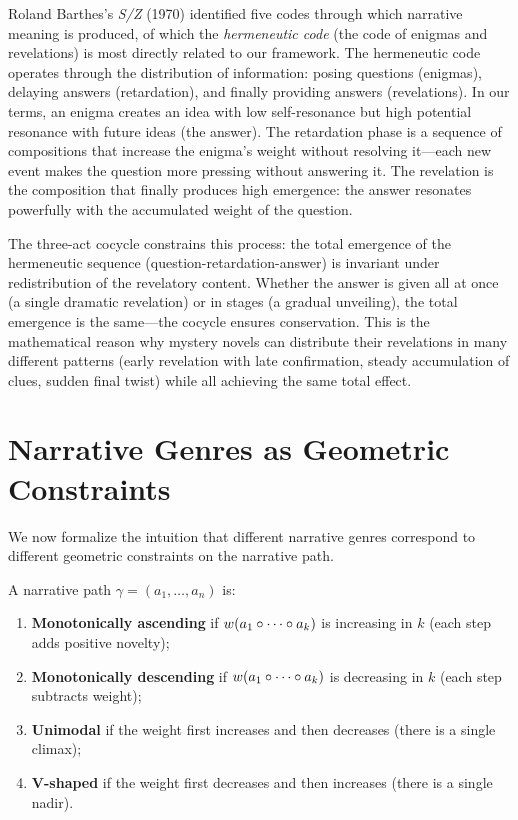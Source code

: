 \begin{remark}
\label{rem:barthes-hermeneutic}
Roland Barthes's \emph{S/Z} (1970) identified five codes through which narrative meaning is produced, of which the \emph{hermeneutic code} (the code of enigmas and revelations) is most directly related to our framework.  The hermeneutic code operates through the distribution of information: posing questions (enigmas), delaying answers (retardation), and finally providing answers (revelations).  In our terms, an enigma creates an idea with low self-resonance but high potential resonance with future ideas (the answer).  The retardation phase is a sequence of compositions that increase the enigma's weight without resolving it---each new event makes the question more pressing without answering it.  The revelation is the composition that finally produces high emergence: the answer resonates powerfully with the accumulated weight of the question.

The three-act cocycle constrains this process: the total emergence of the hermeneutic sequence (question-retardation-answer) is invariant under redistribution of the revelatory content.  Whether the answer is given all at once (a single dramatic revelation) or in stages (a gradual unveiling), the total emergence is the same---the cocycle ensures conservation.  This is the mathematical reason why mystery novels can distribute their revelations in many different patterns (early revelation with late confirmation, steady accumulation of clues, sudden final twist) while all achieving the same total effect.
\end{remark}


\section{Narrative Genres as Geometric Constraints}

We now formalize the intuition that different narrative genres correspond to
different geometric constraints on the narrative path.

\begin{definition}
\label{def:narrative-mono}
A narrative path $\gamma = (a_1, \ldots, a_n)$ is:
\begin{enumerate}
\item \textbf{Monotonically ascending} if $w(a_1 \circ \cdots \circ a_k)$
is increasing in $k$ (each step adds positive novelty);
\item \textbf{Monotonically descending} if $w(a_1 \circ \cdots \circ a_k)$
is decreasing in $k$ (each step subtracts weight);
\item \textbf{Unimodal} if the weight first increases and then decreases
(there is a single climax);
\item \textbf{V-shaped} if the weight first decreases and then increases
(there is a single nadir).
\end{enumerate}
\end{definition}

